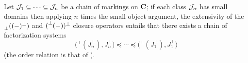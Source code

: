 \begin{theorem}
Let $\mathcal{J}_1\subseteq \cdots \subseteq \mathcal{J}_n$ be a chain of markings on $\mathbf{C}$; if each class $\mathcal{J}_\alpha$ has small domains then applying $n$ times the small object argument, the extensivity of the $\prescript{}{\perp}{((-)^\perp)}$ and $(\prescript{\perp}{}{(-)})^\perp$ closure operators entails that there exists a chain of factorization systems
\[
\big({}^\perp(J_n^\perp),J_n^\perp \big) \preceq \cdots \preceq \big({}^\perp(J_1^\perp),J_1^\perp \big)
\]
(the order relation is that of \adef {}).
\end{theorem}
\setlength{\epigraphwidth}{\DefaultEpigraphWidth}